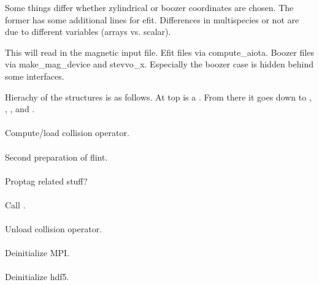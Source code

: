 Some things differ whether zylindrical or boozer coordinates are chosen.
The former has some additional lines for efit.
Differences in multispecies or not are due to different variables
(arrays vs. scalar).

This will read in the magnetic input file.
Efit files via compute\_aiota.
Boozer files via make\_mag\_device and stevvo\_x. Especially the boozer
case is hidden behind some interfaces.

Hierachy of the structures is as follows. At top is a .
From there it goes down to , ,
,  and
.

\paragraph{}
Compute/load collision operator.

\paragraph{}
Second preparation of flint.

\paragraph{}
Proptag related stuff?

\paragraph{}
Call .

\paragraph{}
Unload collision operator.

\paragraph{}
Deinitialize MPI.

\paragraph{}
Deinitialize hdf5.
